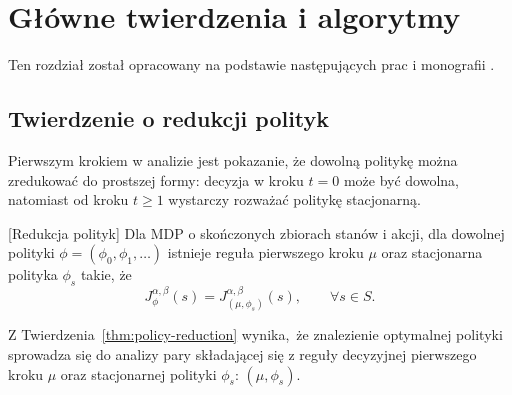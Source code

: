 \chapter{Główne twierdzenia i algorytmy}

Ten rozdział został opracowany na podstawie następujących prac i monografii \cite{eshwar2025,borkar2008,puterman2014,Kallenberg2022}.

\section*{Twierdzenie o redukcji polityk}
Pierwszym krokiem w analizie jest pokazanie, że dowolną politykę można zredukować do prostszej formy: decyzja w kroku $t=0$ może być dowolna, natomiast od kroku $t\ge 1$ wystarczy rozważać politykę stacjonarną.

\begin{theorem} \cite{eshwar2025}[Redukcja polityk]
\label{thm:policy-reduction}
Dla MDP o skończonych zbiorach stanów i akcji, dla dowolnej polityki  $\phi = (\phi_0, \phi_1, \ldots)$ istnieje reguła pierwszego kroku $\mu$ oraz stacjonarna polityka $\phi_s$ takie, że
\[
  J_{\phi}^{\alpha,\beta}(s) = J_{(\mu,\phi_s)}^{\alpha,\beta}(s), \qquad \forall s \in S.
\]

\end{theorem}

Z Twierdzenia~\ref{thm:policy-reduction} wynika, że znalezienie optymalnej polityki sprowadza się do analizy pary składającej się z reguły decyzyjnej pierwszego kroku $\mu$ oraz stacjonarnej polityki $\phi_s$: $(\mu,\phi_s)$.

